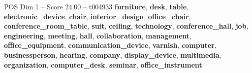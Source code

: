 \begin{textsample}{POS Dim 1 – Score 24.00 – t004933}  \label{ex:f1_pos_031}
\textbf{furniture}, \textbf{desk}, \textbf{table}, \textbf{electronic\_device}, \textbf{chair}, \textbf{interior\_design}, \textbf{office\_chair}, \textbf{conference\_room\_table}, \textbf{suit}, \textbf{ceiling}, \textbf{technology}, \textbf{conference\_hall}, \textbf{job}, \textbf{engineering}, \textbf{meeting}, \textbf{hall}, \textbf{collaboration}, \textbf{management}, \textbf{office\_equipment}, \textbf{communication\_device}, \textbf{varnish}, \textbf{computer}, \textbf{businessperson}, \textbf{hearing}, \textbf{company}, \textbf{display\_device}, \textbf{multimedia}, \textbf{organization}, \textbf{computer\_desk}, \textbf{seminar}, \textbf{office\_instrument}

\end{textsample}

